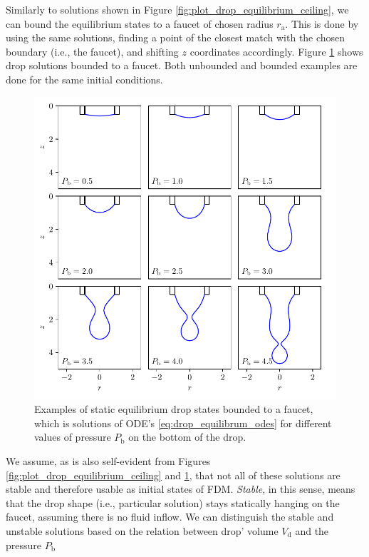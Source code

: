     Similarly to solutions shown in Figure \ref{fig:plot_drop_equilibrium_ceiling}, we can bound the equilibrium states to a faucet of chosen radius $r_{\mathrm{a}}$. This is done by using the same solutions, finding a point of the closest match with the chosen boundary (i.e., the faucet), and shifting $z$ coordinates accordingly. Figure \ref{fig:plot_drop_equilibrium_faucet} shows drop solutions bounded to a faucet. Both unbounded and bounded examples are done for the same initial conditions. 

    \begin{figure}[H]
    \begin{center}
        \includegraphics[width=1.0\columnwidth]{img/plot_drop_equilibrium_faucet.pdf}
    \end{center}
        \caption{Examples of static equilibrium drop states bounded to a faucet, which is solutions of ODE's \eqref{eq:drop_equilibrum_odes} for different values of pressure $P_{\mathrm{b}}$ on the bottom of the drop.}
    \label{fig:plot_drop_equilibrium_faucet}
    \end{figure}

    We assume, as is also self-evident from Figures \ref{fig:plot_drop_equilibrium_ceiling} and \ref{fig:plot_drop_equilibrium_faucet}, that not all of these solutions are stable and therefore usable as initial states of FDM. \emph{Stable}, in this sense, means that the drop shape (i.e., particular solution) stays statically hanging on the faucet, assuming there is no fluid inflow. We can distinguish the stable and unstable solutions based on the relation between drop' volume $V_{\mathrm{d}}$ and the pressure $P_{\mathrm{b}}$ 

